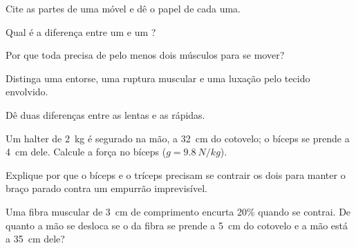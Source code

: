 \begin{exercise}[$\star$]\label{exo:g10:muscles-and-joints:1}
Cite as partes de uma  móvel e dê o papel de cada uma.
\end{exercise}

\begin{exercise}[$\star$]\label{exo:g10:muscles-and-joints:2}
Qual é a diferença entre um  e um ?
\end{exercise}

\begin{exercise}[$\star$]\label{exo:g10:muscles-and-joints:3}
Por que toda  precisa de pelo menos dois músculos para se mover?
\end{exercise}

\begin{exercise}[$\star$]\label{exo:g10:muscles-and-joints:4}
Distinga uma entorse, uma ruptura muscular e uma luxação pelo tecido
envolvido.
\end{exercise}

\begin{exercise}[$\star$]\label{exo:g10:muscles-and-joints:5}
Dê duas diferenças entre as  lentas e as rápidas.
\end{exercise}

\begin{exercise}[$\star\star$]\label{exo:g10:muscles-and-joints:6}
Um halter de \qty{2}{kg} é segurado na mão, a \qty{32}{cm} do cotovelo;
o bíceps se prende a \qty{4}{cm} dele. Calcule a força no bíceps
($g = \qty{9.8}{N/kg}$).
\end{exercise}

\begin{exercise}[$\star\star$]\label{exo:g10:muscles-and-joints:7}
Explique por que o bíceps e o tríceps precisam se contrair os dois para
manter o braço parado contra um empurrão imprevisível.
\end{exercise}

\begin{exercise}[$\star\star$]\label{exo:g10:muscles-and-joints:8}
Uma fibra muscular de \qty{3}{cm} de comprimento encurta 20\% quando se
contrai. De quanto a mão se desloca se o  da fibra se prende a
\qty{5}{cm} do cotovelo e a mão está a \qty{35}{cm} dele?
\end{exercise}

